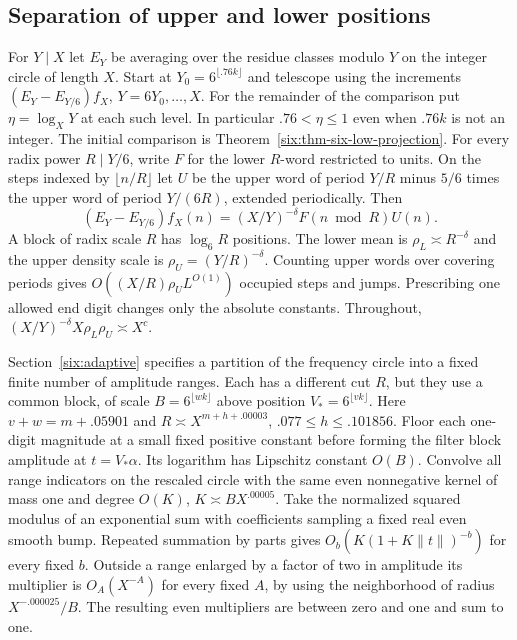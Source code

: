 \documentclass[11pt,a4paper]{article}
\theoremstyle{paperplain}
\numberwithin{equation}{section}
\begin{document}
\subsection{Separation of upper and lower positions}
For $Y\mid X$ let $E_Y$ be averaging over the residue classes modulo
$Y$ on the integer circle of length $X$. Start at
$Y_0=6^{\lfloor .76k\rfloor}$ and telescope using the increments
$(E_Y-E_{Y/6})f_X$, $Y=6Y_0,\ldots,X$.
For the remainder of the comparison put $\eta=\log_XY$ at each
such level. In particular $.76<\eta\le1$ even when $.76k$
is not an integer.
The initial comparison is Theorem~\ref{six:thm-six-low-projection}.
For every radix power $R\mid Y/6$, write $F$ for the lower $R$-word
restricted to units. On the steps indexed by $\lfloor n/R\rfloor$ let
$U$ be the upper word of period $Y/R$ minus $5/6$ times the upper
word of period $Y/(6R)$, extended periodically. Then
\[
 (E_Y-E_{Y/6})f_X(n)=(X/Y)^{-\delta}F(n\bmod R)U(n).
\]
A block of radix scale $R$ has $\log_6 R$ positions. The lower mean is
$\rho_L\asymp R^{-\delta}$ and the upper density scale is
$\rho_U=(Y/R)^{-\delta}$. Counting upper words over covering periods
gives $O((X/R)\rho_U L^{O(1)})$ occupied steps and jumps.
Prescribing one allowed end digit changes only the absolute constants.
Throughout, $(X/Y)^{-\delta}X\rho_L\rho_U\asymp X^c$.

Section~\ref{six:adaptive} specifies a partition of the frequency
circle into a fixed finite number of amplitude ranges. Each has a
different cut $R$, but they use a common block, of scale
$B=6^{\lfloor wk\rfloor}$ above position $V_*=6^{\lfloor vk\rfloor}$.
Here $v+w=m+.05901$ and $R\asymp X^{m+h+.00003}$,
$.077\le h\le .101856$. Floor each one-digit magnitude at a small
fixed positive constant before forming the filter block amplitude at
$t=V_*\alpha$. Its logarithm has Lipschitz constant $O(B)$.
Convolve all range indicators on the rescaled circle with the same
even nonnegative kernel of mass one and degree $O(K)$, $K\asymp
B X^{.00005}$. Take the normalized squared modulus of an exponential
sum with coefficients sampling a fixed real even smooth bump.
Repeated summation by parts gives $O_b(K(1+K\|t\|)^{-b})$ for every
fixed $b$. Outside a range enlarged by a factor of two in amplitude
its multiplier is $O_A(X^{-A})$ for every fixed $A$, by using the
neighborhood of radius $X^{-.000025}/B$. The resulting even multipliers
are between zero and one and sum to one.
\end{document}
